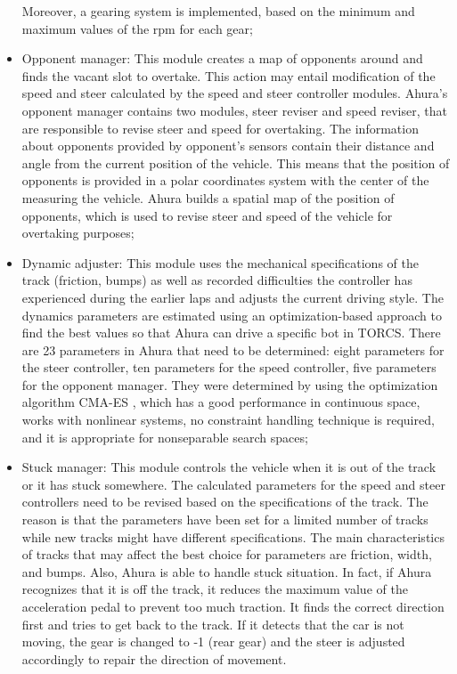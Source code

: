 \begin{itemize}
Moreover, a gearing system is implemented, based on the minimum and maximum values of the rpm for each gear;
\item Opponent manager: This module creates a map of opponents around and finds the vacant slot to overtake. This action may entail modification of the speed and steer calculated by the speed and steer controller modules.
Ahura’s opponent manager contains two modules, steer reviser and speed reviser, that are responsible to revise steer and speed for overtaking. The information about opponents provided by opponent's sensors contain their distance and angle from the current position of the vehicle. This means that the position of opponents is provided in a polar coordinates system with the center of the measuring the vehicle. Ahura builds a spatial map of the position of opponents, which is used to revise steer and speed of the vehicle for overtaking purposes;
\item Dynamic adjuster: This module uses the mechanical specifications of the track (friction, bumps) as well as recorded difficulties the controller has experienced during the earlier laps and adjusts the current driving style.
The dynamics parameters are estimated using an optimization-based approach to find the best values so that Ahura can drive a specific bot in TORCS. There are 23 parameters in Ahura that need to be determined: eight parameters for the steer controller, ten parameters for the speed controller, five parameters for the opponent manager.
They were determined by using the optimization algorithm CMA-ES \cite{cmaes}, which has a good performance in continuous space, works with nonlinear systems, no constraint handling technique is required, and it is appropriate for nonseparable search spaces;
\item Stuck manager: This module controls the vehicle when it is out of the track or it has stuck somewhere.
The calculated parameters for the speed and steer controllers need to be revised based on the specifications of the track. The reason is that the parameters have been set for a limited number of tracks while new tracks might have different specifications. The main characteristics of tracks that may affect the best choice for parameters are friction, width, and bumps. Also, Ahura is able to handle stuck situation. In fact, if Ahura recognizes that it is off the track, it reduces the maximum value of the acceleration pedal to prevent too much traction. It finds the correct direction first and tries to get back to the track. If it detects that the car is not moving, the gear is changed to -1 (rear gear) and the steer is adjusted accordingly to repair the direction of movement.
\end{itemize}


